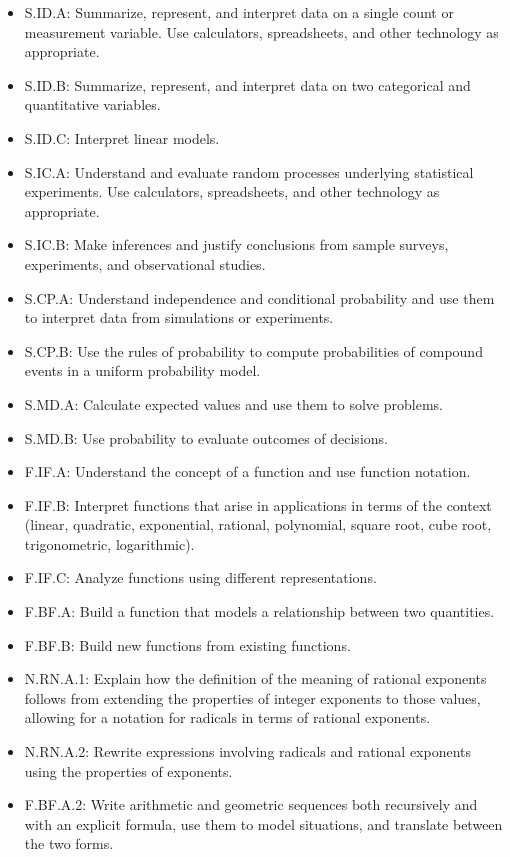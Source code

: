 \documentclass[12pt]{article}
\begin{document}
\begin{itemize}
\item S.ID.A: Summarize, represent, and interpret data on a single count or measurement variable. Use calculators, spreadsheets, and other technology as appropriate.
\item S.ID.B: Summarize, represent, and interpret data on two categorical and quantitative variables.
\item S.ID.C: Interpret linear models.
\item S.IC.A: Understand and evaluate random processes underlying statistical experiments. Use calculators, spreadsheets, and other technology as appropriate.
\item S.IC.B: Make inferences and justify conclusions from sample surveys, experiments, and observational studies.
\item S.CP.A: Understand independence and conditional probability and use them to interpret data from simulations or experiments.
\item S.CP.B: Use the rules of probability to compute probabilities of compound events in a uniform probability model.
\item S.MD.A: Calculate expected values and use them to solve problems.
\item S.MD.B: Use probability to evaluate outcomes of decisions.
\item F.IF.A: Understand the concept of a function and use function notation.
\item F.IF.B: Interpret functions that arise in applications in terms of the context (linear, quadratic, exponential, rational, polynomial, square root, cube root, trigonometric, logarithmic).
\item F.IF.C: Analyze functions using different representations.
\item F.BF.A: Build a function that models a relationship between two quantities.
\item F.BF.B: Build new functions from existing functions.
\item N.RN.A.1:  Explain how the definition of the meaning of rational exponents follows from extending the properties of integer exponents to those values, allowing for a notation for radicals in terms of rational exponents.
\item N.RN.A.2: Rewrite expressions involving radicals and rational exponents using the properties of exponents.
\item F.BF.A.2: Write arithmetic and geometric sequences both recursively and with an explicit formula, use them to model situations, and translate between the two forms.

\end{itemize}
\end{document}
